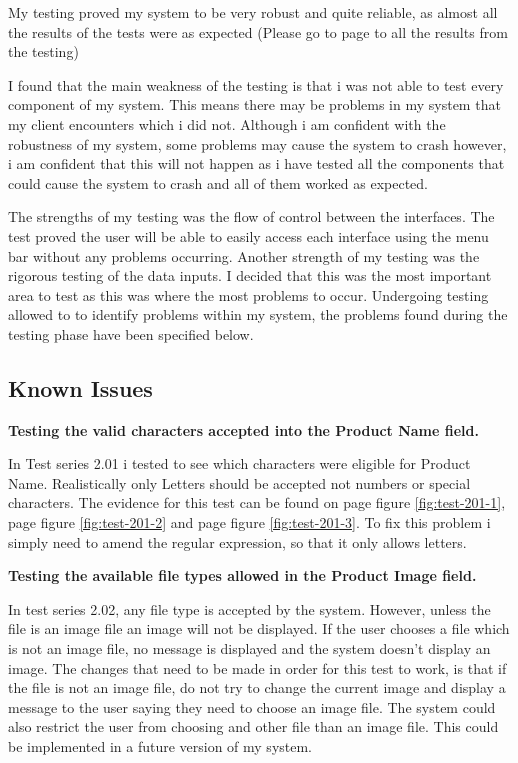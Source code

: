 My testing proved my system to be very robust and quite reliable, as almost all the results of the tests were as expected (Please go to page \pageref{fig:actual-results} to all the results from the testing)

I found that the main weakness of the testing is that i was not able to test every component of my system. This means there may be problems in my system that my client encounters which i did not. Although i am confident with the robustness of my system, some problems may cause the system to crash however, i am confident that this will not happen as i have tested all the components that could cause the system to crash and all of them worked as expected.

The strengths of my testing was the flow of control between the interfaces. The test proved the user will be able to easily access each interface using the menu bar without any problems occurring. Another strength of my testing was the rigorous testing of the data inputs. I decided that this was the most important area to test as this was where the most problems to occur. Undergoing testing allowed to to identify problems within my system, the problems found during the testing phase have been specified below.

\subsection{Known Issues}

\textbf{Testing the valid characters accepted into the Product Name field.}

In Test series 2.01 i tested to see which characters were eligible for Product Name. Realistically only Letters should be accepted not numbers or special characters. The evidence for this test can be found on page \pageref{fig:test-201-1} figure \ref{fig:test-201-1}, page \pageref{fig:test-201-2} figure \ref{fig:test-201-2} and  page \pageref{fig:test-201-3} figure \ref{fig:test-201-3}. To fix this problem i simply need to amend the regular expression, so that it only allows letters. 



\textbf{Testing the available file types allowed in the Product Image field.}

In test series 2.02, any file type is accepted by the system. However, unless the file is an image file an image will not be displayed. If the user chooses a file which is not an image file, no message is displayed and the system doesn't display an image. The changes that need to be made in order for this test to work, is that if the file is not an image file, do not try to change the current image and display a message to the user saying they need to choose an image file. The system could also restrict the user from choosing and other file than an image file. This could be implemented in a future version of my system.


